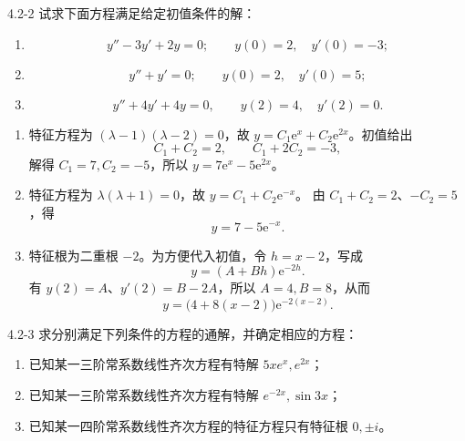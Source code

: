 \documentclass[UTF8,a4paper,11pt]{ctexart}
\newcommand{\e}{\mathrm e}
\begin{document}
\begin{problem}{4.2-2}
试求下面方程满足给定初值条件的解：
  \begin{enumerate}[label=(\arabic*)]
    \item
    \[
      y''-3y'+2y=0;\qquad y(0)=2,\quad y'(0)=-3;
    \]
    \item
    \[
      y''+y'=0;\qquad y(0)=2,\quad y'(0)=5;
    \]
    \item
    \[
      y''+4y'+4y=0,\qquad y(2)=4,\quad y'(2)=0.
    \]
  \end{enumerate}
\end{problem}

\begin{solution}
\begin{enumerate}[label=(\arabic*)]
\item 特征方程为 $(\lambda-1)(\lambda-2)=0$，故
$y=C_1\e^x+C_2\e^{2x}$。初值给出
\[
C_1+C_2=2,\qquad C_1+2C_2=-3,
\]
解得 $C_1=7,C_2=-5$，所以 $\boxed{y=7\e^x-5\e^{2x}}$。

\item 特征方程为 $\lambda(\lambda+1)=0$，故 $y=C_1+C_2\e^{-x}$。
由 $C_1+C_2=2$、$-C_2=5$，得
\[
\boxed{y=7-5\e^{-x}.}
\]

\item 特征根为二重根 $-2$。为方便代入初值，令 $h=x-2$，写成
\[
y=(A+Bh)\e^{-2h}.
\]
有 $y(2)=A$、$y'(2)=B-2A$，所以 $A=4,B=8$，从而
\[
\boxed{y=\bigl(4+8(x-2)\bigr)\e^{-2(x-2)}.}
\]
\end{enumerate}
\end{solution}

\begin{problem}{4.2-3}
求分别满足下列条件的方程的通解，并确定相应的方程：
  \begin{enumerate}[label=(\arabic*)]
    \item 已知某一三阶常系数线性齐次方程有特解 $5xe^x,e^{2x}$；
    \item 已知某一三阶常系数线性齐次方程有特解 $e^{-2x},\sin 3x$；
    \item 已知某一四阶常系数线性齐次方程的特征方程只有特征根 $0,\pm i$。
  \end{enumerate}
\end{problem}
\end{document}
